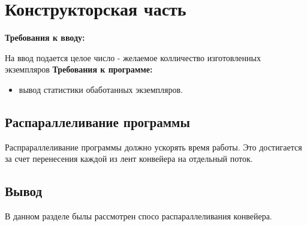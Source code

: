 \chapter{Конструкторская часть}

\noindent\textbf{Требования к вводу:}

На ввод подается целое число - желаемое колличество изготовленных экземпляров
\newline
\textbf{Требования к программе:}
\begin{itemize}
	\item вывод статистики обаботанных экземпляров.
\end{itemize}

\section{Распараллеливание программы}
Распрараллеливание программы должно ускорять время работы. Это достигается за счет перенесения каждой из лент конвейера на отдельный поток.

\section*{Вывод}

В данном разделе былы рассмотрен спосо распараллеливания конвейера.

